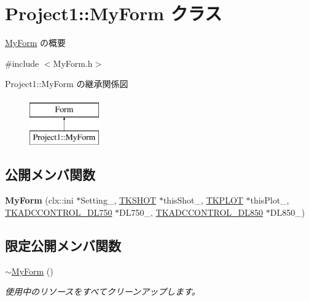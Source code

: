 \hypertarget{class_project1_1_1_my_form}{}\section{Project1\+:\+:My\+Form クラス}
\label{class_project1_1_1_my_form}


\hyperlink{class_project1_1_1_my_form}{My\+Form} の概要  




{\ttfamily \#include $<$My\+Form.\+h$>$}

Project1\+:\+:My\+Form の継承関係図\begin{figure}[H]
\begin{center}
\leavevmode
\includegraphics[height=2.000000cm]{class_project1_1_1_my_form}
\end{center}
\end{figure}
\subsection*{公開メンバ関数}
\begin{DoxyCompactItemize}
\item 
\mbox{\label{class_project1_1_1_my_form_a2d96004e6380e1bdfffe4675083b6769}} 
{\bfseries My\+Form} (clx\+::ini $\ast$Setting\+\_\+, \hyperlink{class_t_k_s_h_o_t}{T\+K\+S\+H\+OT} $\ast$this\+Shot\+\_\+, \hyperlink{class_t_k_p_l_o_t}{T\+K\+P\+L\+OT} $\ast$this\+Plot\+\_\+, \hyperlink{class_t_k_a_d_c_c_o_n_t_r_o_l___d_l750}{T\+K\+A\+D\+C\+C\+O\+N\+T\+R\+O\+L\+\_\+\+D\+L750} $\ast$D\+L750\+\_\+, \hyperlink{class_t_k_a_d_c_c_o_n_t_r_o_l___d_l850}{T\+K\+A\+D\+C\+C\+O\+N\+T\+R\+O\+L\+\_\+\+D\+L850} $\ast$D\+L850\+\_\+)
\end{DoxyCompactItemize}
\subsection*{限定公開メンバ関数}
\begin{DoxyCompactItemize}
\item 
\hyperlink{class_project1_1_1_my_form_a501b2b4481b72877fc73101f1d6f26be}{$\sim$\+My\+Form} ()
\begin{DoxyCompactList}\small\item\em 使用中のリソースをすべてクリーンアップします。 \end{DoxyCompactList}\end{DoxyCompactItemize}


